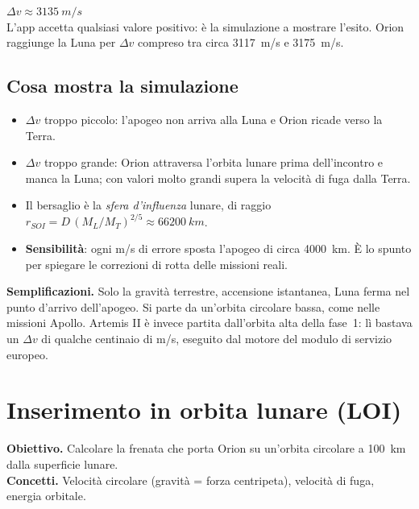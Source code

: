 \documentclass[11pt,a4paper]{article}
\newcommand{\fasenuova}{\clearpage}
\newcommand{\dv}{\Delta v}
\begin{document}
\begin{risultato}
$\dv \approx \SI{3135}{m/s}$\\[0.2em]
{\small L'app accetta qualsiasi valore positivo: è la simulazione a mostrare l'esito. Orion raggiunge la Luna per
$\dv$ compreso tra circa \SI{3117}{m/s} e \SI{3175}{m/s}.}
\end{risultato}

\subsection{Cosa mostra la simulazione}
\begin{itemize}
  \item $\dv$ troppo piccolo: l'apogeo non arriva alla Luna e Orion ricade verso la Terra.
  \item $\dv$ troppo grande: Orion attraversa l'orbita lunare prima dell'incontro e manca la Luna; con valori
        molto grandi supera la velocità di fuga dalla Terra.
  \item Il bersaglio è la \emph{sfera d'influenza} lunare, di raggio
        $r_{SOI} = D\,(M_L/M_T)^{2/5} \approx \SI{66200}{km}$.
  \item \textbf{Sensibilità}: ogni \si{m/s} di errore sposta l'apogeo di circa \SI{4000}{km}. È lo spunto per
        spiegare le correzioni di rotta delle missioni reali.
\end{itemize}

\begin{modello}
\textbf{Semplificazioni.} Solo la gravità terrestre, accensione istantanea, Luna ferma nel punto d'arrivo dell'apogeo.
Si parte da un'orbita circolare bassa, come nelle missioni Apollo. Artemis II è invece partita dall'orbita alta della
fase~1: lì bastava un $\dv$ di qualche centinaio di \si{m/s}, eseguito dal motore del modulo di servizio europeo.
\end{modello}

\fasenuova
\section{Inserimento in orbita lunare (LOI)}

\textbf{Obiettivo.} Calcolare la frenata che porta Orion su un'orbita circolare a \SI{100}{km} dalla superficie lunare.\\
\textbf{Concetti.} Velocità circolare (gravità = forza centripeta), velocità di fuga, energia orbitale.
\end{document}
